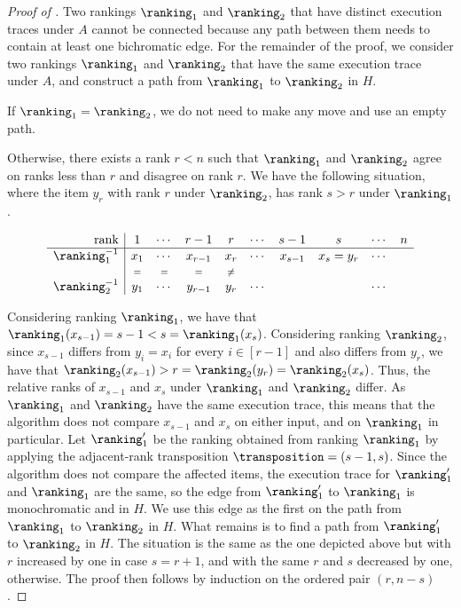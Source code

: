 \documentclass{toc}
\begin{document}
\begin{proof}[Proof of ]
Two rankings $\ranking_1$ and $\ranking_2$ that have distinct execution traces under $A$ cannot be connected because any path between them needs to contain at least one bichromatic edge. For the remainder of the proof, we consider two rankings $\ranking_1$ and $\ranking_2$ that have the same execution trace under $A$, and construct a path from $\ranking_1$ to $\ranking_2$ in $H$.

If $\ranking_1 = \ranking_2$, we do not need to make any move and use an empty path. 

Otherwise, there exists a rank $r<n$ such that $\ranking_1$ and $\ranking_2$ agree on ranks less than $r$ and disagree on rank $r$. We have the following situation, where the item $y_r$ with rank $r$ under $\ranking_2$, has rank $s>r$ under $\ranking_1$. 

\begin{equation*}
    \begin{array}{r|ccccccccc}
      \text{rank} & 1 & \cdots &  r-1 &   r & \cdots & s-1 & s & \cdots &   n \\
      \hline
      \ranking_1^{-1} & x_1 & \cdots & x_{r-1} &   x_r  & \cdots & x_{s-1} & x_s = y_r & \cdots &     \\
       & {\scriptstyle =}  & {\scriptstyle =}  & {\scriptstyle =}  &  {\scriptstyle \ne}  &    &    &  &   &    \\
      \ranking_2^{-1} & y_1 & \cdots & y_{r-1} & y_r & \cdots &     &     & \cdots &    
    \end{array}
\end{equation*}

Considering ranking $\ranking_1$, we have that $\ranking_1(x_{s-1}) = s-1 < s = \ranking_1(x_s)$. Considering ranking $\ranking_2$, since $x_{s-1}$ differs from $y_i=x_i$ for every $i \in [r-1]$ and also differs from $y_r$, we have that $\ranking_2(x_{s-1}) > r = \ranking_2(y_r) = \ranking_2(x_s)$. Thus, the relative ranks of $x_{s-1}$ and $x_s$ under $\ranking_1$ and $\ranking_2$ differ. As $\ranking_1$ and $\ranking_2$ have the same execution trace, this means that the algorithm does not compare $x_{s-1}$ and $x_s$ on either input, and on $\ranking_1$ in particular. Let $\ranking'_1$ be the ranking obtained from ranking $\ranking_1$ by applying the adjacent-rank transposition $\transposition = (s-1,s)$. Since the algorithm does not compare the affected items, the execution trace for $\ranking'_1$ and $\ranking_1$ are the same, so the edge from $\ranking'_1$ to $\ranking_1$ is monochromatic and in $H$. We use this edge as the first on the path from $\ranking_1$ to $\ranking_2$ in $H$. What remains is to find a path from $\ranking'_1$ to $\ranking_2$ in $H$. The situation is the same as the one depicted above but with $r$ increased by one in case $s=r+1$, and with the same $r$ and $s$ decreased by one, otherwise. The proof then follows by induction on the ordered pair $(r,n-s)$. 
\end{proof}
\end{document}
